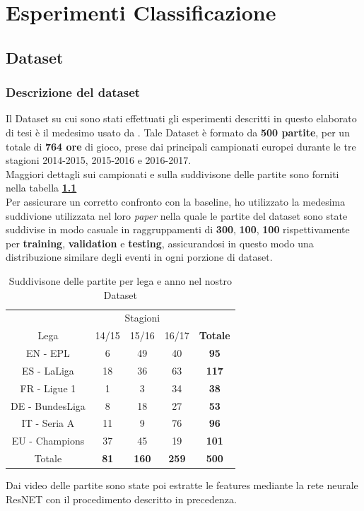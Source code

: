\chapter{Esperimenti Classificazione}\label{ch:chapter2}
\section{Dataset}
\subsection{Descrizione del dataset }
Il Dataset su cui sono stati effettuati gli esperimenti descritti in questo elaborato di tesi è il medesimo usato da \citet{soccerNet}.
Tale Dataset è formato da \textbf{500 partite}, per un totale di \textbf{764 ore} di gioco, prese dai principali campionati europei durante le tre stagioni 2014-2015, 2015-2016 e 2016-2017.
\\Maggiori dettagli sui campionati e sulla suddivisone delle partite sono forniti nella tabella \textbf{\ref{table: Dataset}}
\\Per assicurare un corretto confronto con la baseline, ho utilizzato la medesima suddivione utilizzata nel loro \textit{paper} \cite{soccerNet} nella quale le partite del dataset sono state suddivise in modo casuale in raggruppamenti di \textbf{300}, \textbf{100}, \textbf{100} rispettivamente per \textbf{training}, \textbf{validation} e \textbf{testing}, assicurandosi in questo modo una distribuzione similare degli eventi in ogni porzione di dataset.
\begin{table}[H]
\caption{Suddivisone delle partite per lega e anno nel nostro Dataset}
\centering
\begin{tabular}{c| | c|c|c | | c}
\multicolumn{1}{c}{}&\multicolumn{3}{c}{Stagioni}& \\
Lega & 14/15 & 15/16 & 16/17 & \textbf{Totale} \\
\hline
EN - EPL & 6 & 49 & 40 & \textbf{95} \\
ES - LaLiga & 18 & 36 & 63 & \textbf{117} \\
FR - Ligue 1 & 1 &  3 & 34 & \textbf{38} \\
DE - BundesLiga & 8 & 18 & 27 & \textbf{53} \\
IT - Seria A & 11 & 9 & 76 & \textbf{96} \\
EU - Champions & 37 & 45 & 19 & \textbf{101} \\
\hline
Totale & \textbf{81} & \textbf{160} & \textbf{259} & \textbf{500} \\ [1ex]

\end{tabular}
\label{table: Dataset}
\end{table}
Dai video delle partite sono state poi estratte le features mediante la rete neurale ResNET con il procedimento descritto in precedenza.

